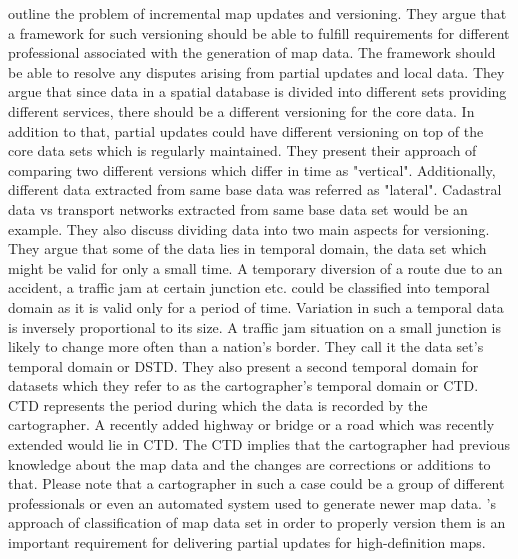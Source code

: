 \citet{cooper2001incremental} outline the problem of incremental map updates and versioning. They argue that a framework for such versioning should be able to fulfill requirements for different professional associated with the generation of map data. The framework should be able to resolve any disputes arising from partial updates and local data. They argue that since data in a spatial database is divided into different sets providing different services, there should be a different versioning for the core data. In addition to that, partial updates could have different versioning on top of the core data sets which is regularly maintained. They present their approach of comparing two different versions which differ in time as "vertical". Additionally, different data extracted from same base data was referred as "lateral". Cadastral data vs transport networks extracted from same base data set would be an example. They also discuss dividing data into two main aspects for versioning. They argue that some of the data lies in temporal domain, the data set which might be valid for only a small time. A temporary diversion of a route due to an accident, a traffic jam at certain junction etc. could be classified into temporal domain as it is valid only for a period of time. Variation in such a temporal data is inversely proportional to its size. A traffic jam situation on a small junction is likely to change more often than a nation's border. They call it the data set's temporal domain or DSTD. They also present a second temporal domain for datasets which they refer to as the cartographer's temporal domain or CTD. CTD represents the period during which the data is recorded by the cartographer. A recently added highway or bridge or a road which was recently extended would lie in CTD. The CTD implies that the cartographer had previous knowledge about the map data and the changes are corrections or additions to that. Please note that a cartographer in such a case could be a group of different professionals or even an automated system used to generate newer map data. \cite{cooper2001incremental}'s approach of classification of map data set in order to properly version them is an important requirement for delivering partial updates for high-definition maps. 


